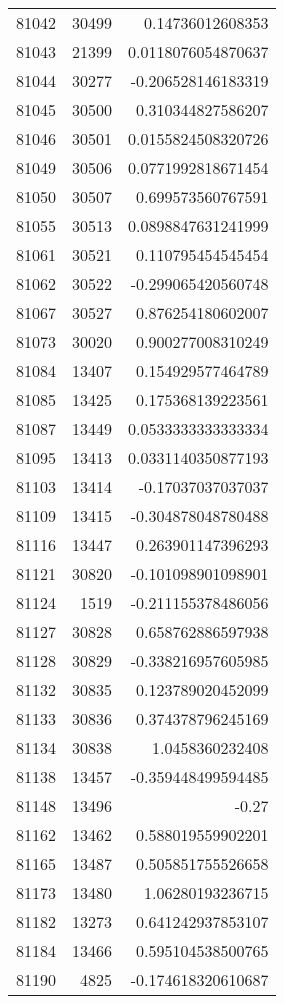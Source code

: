 \begin{tabular}{r | r | r}
81042 & 30499 & 0.14736012608353 \\
81043 & 21399 & 0.0118076054870637 \\
81044 & 30277 & -0.206528146183319 \\
81045 & 30500 & 0.310344827586207 \\
81046 & 30501 & 0.0155824508320726 \\
81049 & 30506 & 0.0771992818671454 \\
81050 & 30507 & 0.699573560767591 \\
81055 & 30513 & 0.0898847631241999 \\
81061 & 30521 & 0.110795454545454 \\
81062 & 30522 & -0.299065420560748 \\
81067 & 30527 & 0.876254180602007 \\
81073 & 30020 & 0.900277008310249 \\
81084 & 13407 & 0.154929577464789 \\
81085 & 13425 & 0.175368139223561 \\
81087 & 13449 & 0.0533333333333334 \\
81095 & 13413 & 0.0331140350877193 \\
81103 & 13414 & -0.17037037037037 \\
81109 & 13415 & -0.304878048780488 \\
81116 & 13447 & 0.263901147396293 \\
81121 & 30820 & -0.101098901098901 \\
81124 & 1519 & -0.211155378486056 \\
81127 & 30828 & 0.658762886597938 \\
81128 & 30829 & -0.338216957605985 \\
81132 & 30835 & 0.123789020452099 \\
81133 & 30836 & 0.374378796245169 \\
81134 & 30838 & 1.0458360232408 \\
81138 & 13457 & -0.359448499594485 \\
81148 & 13496 & -0.27 \\
81162 & 13462 & 0.588019559902201 \\
81165 & 13487 & 0.505851755526658 \\
81173 & 13480 & 1.06280193236715 \\
81182 & 13273 & 0.641242937853107 \\
81184 & 13466 & 0.595104538500765 \\
81190 & 4825 & -0.174618320610687 \\

\end{tabular}
